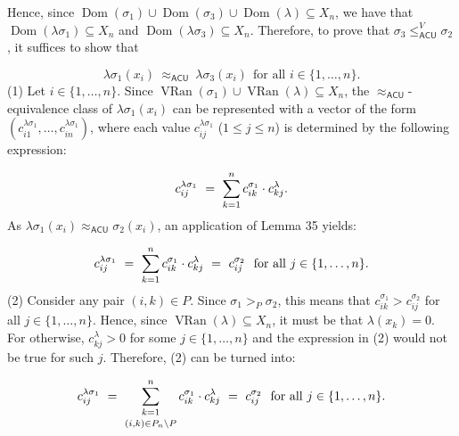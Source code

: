 \documentclass[10pt,a4paper]{amsart}
\begin{document}
  
Hence, since $\operatorname{Dom}(\sigma_{1})\cup\operatorname{Dom}(\sigma_{3})\cup%
\operatorname{Dom}(\lambda)\subseteq X_{n}$, we have that $\operatorname{Dom}(\lambda\sigma_{1})\subseteq X_{n}$ and $\operatorname{Dom}(\lambda\sigma_{3})\subseteq X_{n}$. Therefore, to prove that $\sigma_{3}\leq_{\mathsf{ACU}}^{V}\sigma_{2}$, it suffices to show that\par
    \[\lambda\sigma_{1}(x_{i})\ \approx_{\mathsf{ACU}}\ \lambda\sigma_{3}(x_{i})\ \ %
\mbox{for all }i\in\{1,\ldots,n\}.\]  (1)   
Let $i\in\{1,\ldots,n\}$. Since $\operatorname{VRan}(\sigma_{1})\cup\operatorname{VRan}(\lambda)\subseteq X_{n}$, the $\approx_{\mathsf{ACU}}$-equivalence class of $\lambda\sigma_{1}(x_{i})$ can be represented with a vector of the form $(c^{\lambda\sigma_{1}}_{i1},\ldots,c^{\lambda\sigma_{1}}_{in})$, where each value $c^{\lambda\sigma_{1}}_{ij}$ ($1\leq j\leq n$) is determined by the following expression:\par
    \[c^{\lambda\sigma_{1}}_{ij}\ =\ \sum_{k=1}^{n}c^{\sigma_{1}}_{ik}\cdot c^{%
\lambda}_{kj}.\]    
As $\lambda\sigma_{1}(x_{i})\approx_{\mathsf{ACU}}\sigma_{2}(x_{i})$, an application of Lemma 35 yields:\par
    \[c^{\lambda\sigma_{1}}_{ij}\ =\ \sum_{k=1}^{n}c^{\sigma_{1}}_{ik}\cdot c^{%
\lambda}_{kj}\ =\ c^{\sigma_{2}}_{ij}\ \ \mbox{for all }j\in\{1,\ldots,n\}.\]  (2)   
Consider any pair $(i,k)\in P$. Since $\sigma_{1}>_{P}\sigma_{2}$, this means that $c^{\sigma_{1}}_{ik}>c^{\sigma_{2}}_{ij}$ for all $j\in\{1,\ldots,n\}$. Hence, since $\operatorname{VRan}(\lambda)\subseteq X_{n}$, it must be that $\lambda(x_{k})=0$. For otherwise, $c^{\lambda}_{kj}>0$ for some $j\in\{1,\ldots,n\}$ and the expression in (2) would not be true for such $j$. Therefore, (2) can be turned into:\par
    \[c^{\lambda\sigma_{1}}_{ij}\ =\ \sum_{\begin{subarray}{c}k=1\\[2.45836pt]
(i,k)\in P_{n}\setminus P\end{subarray}}^{n}c^{\sigma_{1}}_{ik}\cdot c^{%
\lambda}_{kj}\ =\ c^{\sigma_{2}}_{ij}\ \ \mbox{for all }j\in\{1,\ldots,n\}.\]    
 
 
\end{document}
